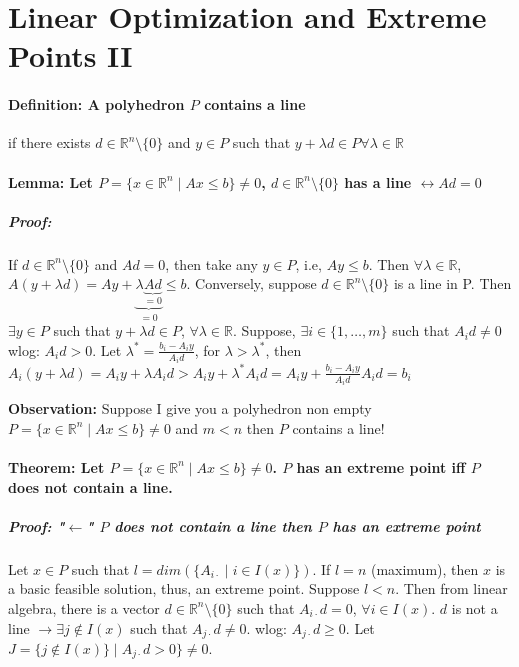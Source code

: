 \documentclass[main]{subfiles}
\begin{document}

\section{Linear Optimization and Extreme Points II}

\paragraph{Definition: A polyhedron $P$ contains a line} if there exists $d \in
\mathbb{R}^{n}\setminus\{0\}$ and $y \in P$ such that $y + \lambda d \in P
\forall \lambda \in \mathbb{R}$

\paragraph{Lemma: Let $P = \{ x \in \mathbb{R}^{n} \mid Ax \leq b \} \neq 0$,
$d \in \mathbb{R}^{n}\setminus \{0\}$ has a line $\leftrightarrow Ad = 0$ }

\subparagraph{Proof:}

If $d \in \mathbb{R}^{n}\setminus \{0\}$ and $Ad=0$, then take any $y \in P$,
i.e, $Ay \leq b$. Then $\forall \lambda \in \mathbb{R}$, $A(y+\lambda d) = Ay +
\underbrace{\lambda \underbrace{Ad}_{=0}}_{=0} \leq b$.
Conversely, suppose $d \in \mathbb{R}^{n}\setminus \{0\}$ is a line in P. Then
$\exists y \in P$ such that $y + \lambda d \in P$, $\forall \lambda \in
\mathbb{R}$.
Suppose, $\exists i \in \{1, \dots, m \}$ such that $A_{i}d \neq 0$ wlog:
$A_{i}d > 0$. Let $\lambda^{*} = \frac{b_{i} - A_{i}y}{A_{i}d}$, for $\lambda >
\lambda^{*}$, then $A_{i}(y + \lambda d) = A_{i}y + \lambda A_{i}d > A_{i}y +
\lambda^{*}A_{i}d = A_{i}y + \frac{b_{i} - A_{i}y}{A_{i}d} A_{i}d = b_{i}$

\textbf{Observation:} Suppose I give you a polyhedron non empty $P = \{x \in
\mathbb{R}^{n} \mid Ax \leq b\} \neq 0$ and $m < n$ then $P$ contains a line!

\paragraph{Theorem: Let $P = \{x \in \mathbb{R}^{n} \mid Ax \leq b\} \neq 0$.
$P$ has an extreme point iff $P$ does not contain a line.}

\subparagraph{Proof: "$\leftarrow$" $P$ does not contain a line then $P$ has an
extreme point}
Let $x \in P$ such that $l = dim(\{A_{i\cdot} \mid i \in I(x)\})$. If $l = n$
(maximum), then $x$ is a basic feasible solution, thus, an extreme point.
Suppose $l < n$. Then from linear algebra, there is a vector $ d \in
\mathbb{R}^{n}\setminus\{0\}$ such that $A_{i\cdot}d = 0$, $\forall i \in
I(x)$. $d$ is not a line $\rightarrow \exists j \notin I(x)$ such that
$A_{j\cdot}d \neq 0$. wlog: $A_{j\cdot}d \geq 0$. Let $J = \{j \notin I(x)\}
\mid A_{j\cdot}d > 0\} \neq 0$.
\end{document}
